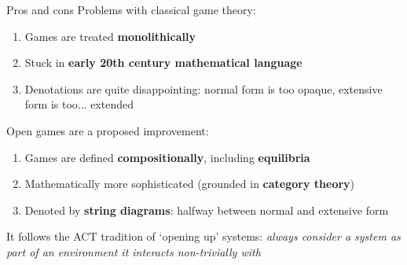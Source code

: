 \begin{frame}{Pros and cons}
	Problems with classical game theory:
	\begin{enumerate}
		\item Games are treated \textbf{monolithically}
		\item Stuck in \textbf{early 20th century mathematical language}
		\item Denotations are quite disappointing: normal form is too opaque, extensive form is too... extended
	\end{enumerate}

	Open games are a proposed improvement:
	\begin{enumerate}
		\item Games are defined \textbf{compositionally}, including \textbf{equilibria}
		\item Mathematically more sophisticated (grounded in \textbf{category theory})
		\item Denoted by \textbf{string diagrams}: halfway between normal and extensive form
	\end{enumerate}

	It follows the ACT tradition of `opening up' systems: \emph{always consider a system as part of an environment it interacts non-trivially with}
\end{frame}
